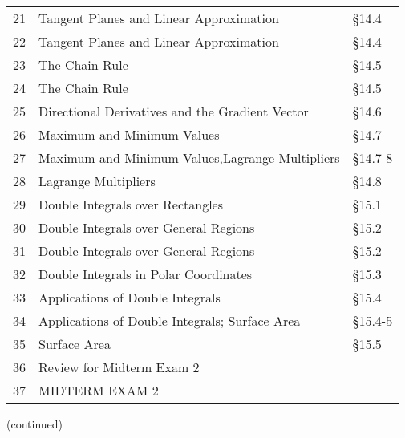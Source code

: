 \documentclass[11pt]{article}
\begin{document}
\begin{tabular}{|l|l|l|}
21&Tangent Planes and Linear Approximation& \S 14.4\\
22&Tangent Planes and Linear Approximation& \S 14.4\\
23&The Chain Rule& \S 14.5 \\
24&The Chain Rule& \S 14.5\\

25&Directional Derivatives and the Gradient Vector& \S 14.6\\
26&Maximum and Minimum Values& \S 14.7\\
27&Maximum and Minimum Values,Lagrange Multipliers& \S 14.7-8\\
28&Lagrange Multipliers&\S 14.8\\

29&Double Integrals over Rectangles& \S15.1 \\
30&Double Integrals over General Regions& \S15.2 \\
31&Double Integrals over General Regions&\S15.2  \\
32&Double Integrals in Polar Coordinates&\S15.3  \\

33&Applications of Double Integrals&\S15.4  \\

34&Applications of Double Integrals; Surface Area&\S15.4-5  \\
35&Surface Area&\S15.5  \\
36&Review for Midterm Exam 2&  \\
\hline
37&MIDTERM EXAM 2&  \\
\hline
\end{tabular}

(continued)
\end{document}
